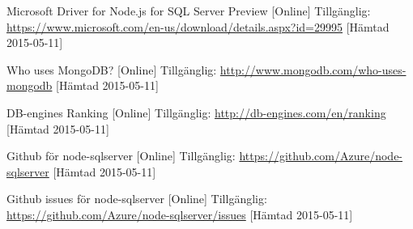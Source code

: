 \begin{thebibliography}{9}
Microsoft Driver for Node.js for SQL Server Preview [Online] Tillgänglig: 
\url{https://www.microsoft.com/en-us/download/details.aspx?id=29995} [Hämtad 2015-05-11]

Who uses MongoDB? [Online] Tillgänglig: 
\url{http://www.mongodb.com/who-uses-mongodb} [Hämtad 2015-05-11]

DB-engines Ranking [Online] Tillgänglig: 
\url{http://db-engines.com/en/ranking} [Hämtad 2015-05-11]

Github för node-sqlserver [Online] Tillgänglig:  
\url{https://github.com/Azure/node-sqlserver} [Hämtad 2015-05-11]

Github issues för node-sqlserver [Online] Tillgänglig: 
\url{https://github.com/Azure/node-sqlserver/issues} [Hämtad 2015-05-11]

\end{thebibliography}
